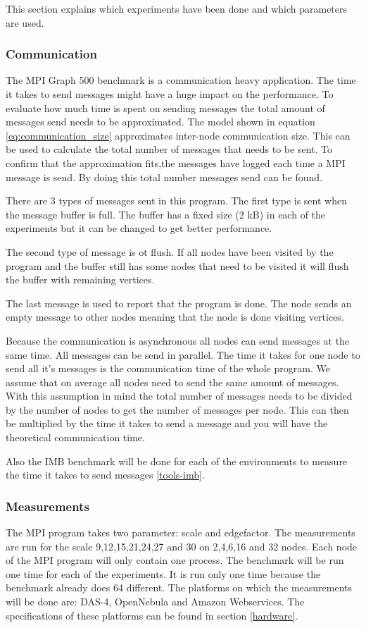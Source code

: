 This section explains which experiments have been done and which parameters are used.

\subsubsection{Communication}
\label{med:comm}
The MPI Graph 500 benchmark is a communication heavy application. The time it takes to send messages might have a huge impact on the performance. To evaluate how much time is spent on sending messages the total amount of messages send needs to be approximated. The model shown in equation \ref{eq:communication_size} approximates inter-node communication size. This can be used to calculate the total number of messages that needs to be sent. To confirm that the approximation fits,the messages have logged each time a MPI message is send. By doing this total number messages send can be found. 

There are 3 types of messages sent in this program. The first type is sent when the message buffer is full. The buffer has a fixed size (2 kB) in each of the experiments but it can be changed to get better performance. 

The second type of message is ot flush. If all nodes have been visited by the program and the buffer still has some nodes that need to be visited it will flush the buffer with remaining vertices.

The last message is used to report that the program is done. The node sends an empty message to other nodes meaning that the node is done visiting vertices.

Because the communication is asynchronous all nodes can send messages at the same time. All messages can be send in parallel. The time it takes for one node to send all it's messages is the communication time of the whole program. We assume that on average all nodes need to send the same amount of messages. With this assumption in mind the total number of messages needs to be divided by the number of nodes to get the number of messages per node. This can then be multiplied by the time it takes to send a message and you will have the theoretical communication time.  

Also the IMB benchmark will be done for each of the environments to measure the time it takes to send messages \ref{tools-imb}.


\subsubsection{Measurements}
The MPI program takes two parameter: scale and edgefactor. The measurements are run for the scale 9,12,15,21,24,27 and 30 on 2,4,6,16 and 32 nodes. Each node of the MPI program will only contain one process. The benchmark will be run one time for each of the experiments. It is run only one time because the benchmark already does 64 different. The platforms on which the measurements will be done are: DAS-4, OpenNebula and Amazon Webservices. The specifications of these platforms can be found in section \ref{hardware}.

